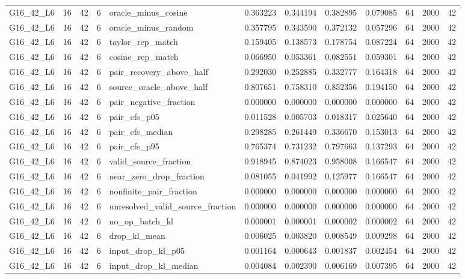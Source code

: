 \begin{tabular}{lrlrlrrrrrrr}
G16_42_L6 & 16 & 42 & 6 & oracle_minus_cosine & 0.363223 & 0.344194 & 0.382895 & 0.079085 & 64 & 2000 & 42 \\
G16_42_L6 & 16 & 42 & 6 & oracle_minus_random & 0.357795 & 0.343590 & 0.372132 & 0.057296 & 64 & 2000 & 42 \\
G16_42_L6 & 16 & 42 & 6 & taylor_rep_match & 0.159405 & 0.138573 & 0.178754 & 0.087224 & 64 & 2000 & 42 \\
G16_42_L6 & 16 & 42 & 6 & cosine_rep_match & 0.066950 & 0.053361 & 0.082551 & 0.059301 & 64 & 2000 & 42 \\
G16_42_L6 & 16 & 42 & 6 & pair_recovery_above_half & 0.292030 & 0.252885 & 0.332777 & 0.164318 & 64 & 2000 & 42 \\
G16_42_L6 & 16 & 42 & 6 & source_oracle_above_half & 0.807651 & 0.758310 & 0.852356 & 0.194150 & 64 & 2000 & 42 \\
G16_42_L6 & 16 & 42 & 6 & pair_negative_fraction & 0.000000 & 0.000000 & 0.000000 & 0.000000 & 64 & 2000 & 42 \\
G16_42_L6 & 16 & 42 & 6 & pair_cfs_p05 & 0.011528 & 0.005703 & 0.018317 & 0.025640 & 64 & 2000 & 42 \\
G16_42_L6 & 16 & 42 & 6 & pair_cfs_median & 0.298285 & 0.261449 & 0.336670 & 0.153013 & 64 & 2000 & 42 \\
G16_42_L6 & 16 & 42 & 6 & pair_cfs_p95 & 0.765374 & 0.731232 & 0.797663 & 0.137293 & 64 & 2000 & 42 \\
G16_42_L6 & 16 & 42 & 6 & valid_source_fraction & 0.918945 & 0.874023 & 0.958008 & 0.166547 & 64 & 2000 & 42 \\
G16_42_L6 & 16 & 42 & 6 & near_zero_drop_fraction & 0.081055 & 0.041992 & 0.125977 & 0.166547 & 64 & 2000 & 42 \\
G16_42_L6 & 16 & 42 & 6 & nonfinite_pair_fraction & 0.000000 & 0.000000 & 0.000000 & 0.000000 & 64 & 2000 & 42 \\
G16_42_L6 & 16 & 42 & 6 & unresolved_valid_source_fraction & 0.000000 & 0.000000 & 0.000000 & 0.000000 & 64 & 2000 & 42 \\
G16_42_L6 & 16 & 42 & 6 & no_op_batch_kl & 0.000001 & 0.000001 & 0.000002 & 0.000002 & 64 & 2000 & 42 \\
G16_42_L6 & 16 & 42 & 6 & drop_kl_mean & 0.006025 & 0.003820 & 0.008549 & 0.009298 & 64 & 2000 & 42 \\
G16_42_L6 & 16 & 42 & 6 & input_drop_kl_p05 & 0.001164 & 0.000643 & 0.001837 & 0.002454 & 64 & 2000 & 42 \\
G16_42_L6 & 16 & 42 & 6 & input_drop_kl_median & 0.004084 & 0.002390 & 0.006169 & 0.007395 & 64 & 2000 & 42 \\

\end{tabular}
